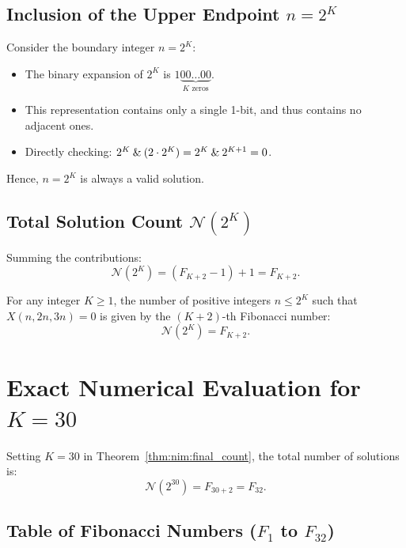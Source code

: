 ﻿\documentclass[a4paper]{article}
\begin{document}
\subsection{Inclusion of the Upper Endpoint $n = 2^K$}
Consider the boundary integer $n = 2^K$:
\begin{itemize}
    \item The binary expansion of $2^K$ is $1\underbrace{00\dots00}_{K \text{ zeros}}$.
    \item This representation contains only a single 1-bit, and thus contains no adjacent ones.
    \item Directly checking: $2^K \mathbin{\&} (2 \cdot 2^K) = 2^K \mathbin{\&} 2^{K+1} = 0$.
\end{itemize}
Hence, $n = 2^K$ is always a valid solution.

\subsection{Total Solution Count $\mathcal{N}(2^K)$}
Summing the contributions:
\begin{equation}
\mathcal{N}(2^K) = (F_{K+2} - 1) + 1 = F_{K+2}.
\end{equation}

\begin{theorem}\label{thm:nim:final_count}
For any integer $K \ge 1$, the number of positive integers $n \le 2^K$ such that $X(n, 2n, 3n) = 0$ is given by the $(K+2)$-th Fibonacci number:
\begin{equation}
\mathcal{N}(2^K) = F_{K+2}.
\end{equation}
\end{theorem}


\section{Exact Numerical Evaluation for $K = 30$}

Setting $K = 30$ in Theorem~\ref{thm:nim:final_count}, the total number of solutions is:
\begin{equation}
\mathcal{N}(2^{30}) = F_{30+2} = F_{32}.
\end{equation}

\subsection{Table of Fibonacci Numbers ($F_1$ to $F_{32}$)}
\end{document}
